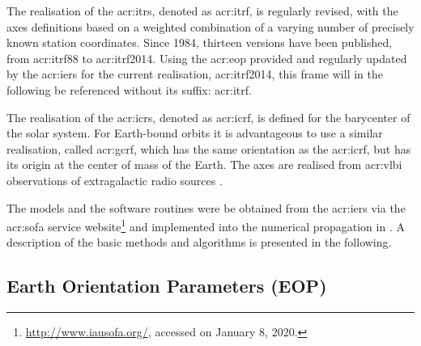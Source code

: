 The realisation of the \gls{acr:itrs}, denoted as \gls{acr:itrf}, is regularly revised, with the axes definitions based on a weighted combination of a varying number of precisely
known station coordinates. Since 1984, thirteen versions have been published, from \acrshort{acr:itrf}88 to \acrshort{acr:itrf}2014. Using the \gls{acr:eop}
provided and regularly updated by the \gls{acr:iers} for the current realisation, \acrshort{acr:itrf}2014, this frame will in the following be referenced without its suffix:
\acrshort{acr:itrf}.

The realisation of the \gls{acr:icrs}, denoted as \gls{acr:icrf}, is defined for the barycenter of the solar system. For Earth-bound orbits it is advantageous to use a 
similar realisation, called \gls{acr:gcrf}, which has the same orientation as the \gls{acr:icrf}, but has its origin at the center of mass of the Earth. The 
axes are realised from \gls{acr:vlbi} observations of extragalactic radio sources \citep{luzum2010}.

The models and the software routines were be obtained from the \gls{acr:iers} via the \gls{acr:sofa} service website\footnote{\url{http://www.iausofa.org/}, accessed on January 8, 2020.} and implemented into the numerical 
propagation in \neptune. A description of the basic methods and algorithms is presented in the following.

\subsection{Earth Orientation Parameters (EOP)}
\label{sec:eop}

